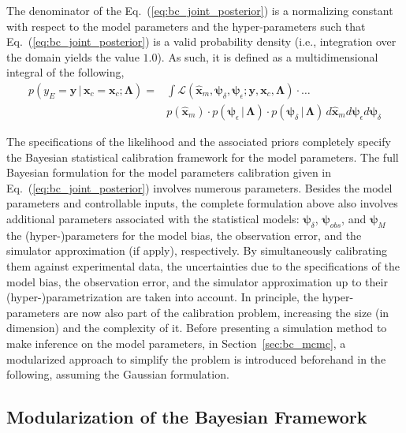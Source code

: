 The denominator of the Eq.~(\ref{eq:bc_joint_posterior}) is a normalizing constant with respect to the model parameters and the hyper-parameters such that Eq.~(\ref{eq:bc_joint_posterior}) is a valid probability density (i.e., integration over the domain yields the value $1.0$).
As such, it is defined as a multidimensional integral of the following,
\begin{equation}
	\begin{split}
	p(y_E = \mathbf{y} \,|\, \bm{x}_c = \mathbf{x}_c ; \bm{\Lambda}) = & \int \mathcal{L}(\hat{\bm{x}}_m,\bm{\psi}_\delta, \bm{\psi}_\epsilon ;  \mathbf{y}, \mathbf{x}_c, \bm{\Lambda}) \cdot \ldots \\
	& p(\hat{\bm{x}}_m) \cdot p(\bm{\psi}_\epsilon\,|\,\bm{\Lambda}) \cdot p(\bm{\psi}_\delta\,|\,\bm{\Lambda}) \, d\hat{\bm{x}}_m d\bm{\psi}_\epsilon d\bm{\psi}_\delta
	\end{split}
\label{eq:bc_normalizing_constant}
\end{equation}

The specifications of the likelihood and the associated priors completely specify the Bayesian statistical calibration framework for the model parameters.
The full Bayesian formulation for the model parameters calibration given in Eq.~(\ref{eq:bc_joint_posterior}) involves numerous parameters.
Besides the model parameters and controllable inputs, the complete formulation above also involves additional parameters associated with the statistical models: $\bm{\psi}_\delta$, $\bm{\psi}_{obs}$, and $\bm{\psi}_M$ the (hyper-)para\-meters for the model bias, the observation error, and the simulator approximation (if apply), respectively.
By simultaneously calibrating them against experimental data,
the uncertainties due to the specifications of the model bias, the observation error, and the simulator approximation up to their (hyper-)parametrization are taken into account.
In principle, the hyper-parameters are now also part of the calibration problem, increasing the size (in dimension) and the complexity of it.
Before presenting a simulation method to make inference on the model parameters, in Section~\ref{sec:bc_mcmc}, 
a modularized approach \cite{Liu2005} to simplify the problem is introduced beforehand in the following, assuming the Gaussian formulation.

\subsection{Modularization of the Bayesian Framework}\label{sub:bc_modularization}


